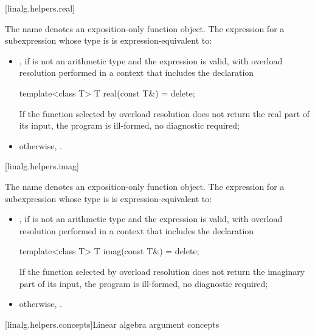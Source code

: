 [linalg.helpers.real]{}

\pnum
The name  denotes an exposition-only function object.
The expression  for a subexpression 
whose type is  is expression-equivalent to:
\begin{itemize}
\item
{},
if  is not an arithmetic type and
the expression  is valid,
with overload resolution performed in a context that includes the declaration
\begin{codeblock}
template<class T> T real(const T&) = delete;
\end{codeblock}
If the function selected by overload resolution
does not return the real part of its input,
the program is ill-formed, no diagnostic required;
\item
otherwise, .
\end{itemize}

[linalg.helpers.imag]{}

\pnum
The name  denotes an exposition-only function object.
The expression  for a subexpression 
whose type is  is expression-equivalent to:
\begin{itemize}
\item
{},
if  is not an arithmetic type and the expression 
is valid, with overload resolution performed in a context
that includes the declaration
\begin{codeblock}
template<class T> T imag(const T&) = delete;
\end{codeblock}
If the function selected by overload resolution
does not return the imaginary part of its input,
the program is ill-formed, no diagnostic required;
\item
otherwise, .
\end{itemize}

[linalg.helpers.concepts]{Linear algebra argument concepts}

